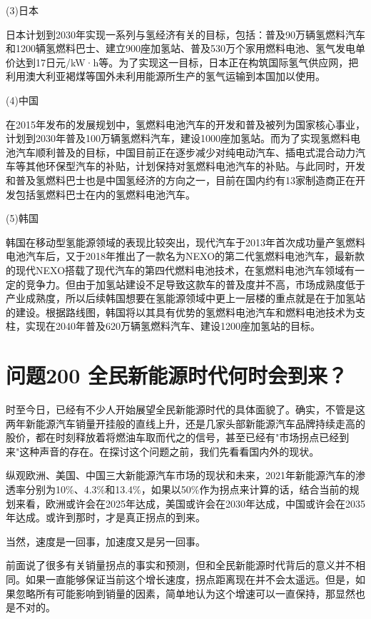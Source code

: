 \documentclass[12pt,UTF8]{ctexbook}
\begin{document}
(3)日本

日本计划到2030年实现一系列与氢经济有关的目标，包括：普及90万辆氢燃料汽车和1200辆氢燃料巴士、建立900座加氢站、普及530万个家用燃料电池、氢气发电单价达到17日元/kW·h等。为了实现这一目标，日本正在构筑国际氢气供应网，把利用澳大利亚褐煤等国外未利用能源所生产的氢气运输到本国加以使用。

(4)中国

在2015年发布的发展规划中，氢燃料电池汽车的开发和普及被列为国家核心事业，计划到2030年普及100万辆氢燃料汽车，建设1000座加氢站。而为了实现氢燃料电池汽车顺利普及的目标，中国目前正在逐步减少对纯电动汽车、插电式混合动力汽车等其他环保型汽车的补贴，计划保持对氢燃料电池汽车的补贴。与此同时，开发和普及氢燃料巴士也是中国氢经济的方向之一，目前在国内约有13家制造商正在开发包括氢燃料巴士在内的氢燃料电池汽车。

(5)韩国

韩国在移动型氢能源领域的表现比较突出，现代汽车于2013年首次成功量产氢燃料电池汽车后，又于2018年推出了一款名为NEXO的第二代氢燃料电池汽车，最新款的现代NEXO搭载了现代汽车的第四代燃料电池技术，在氢燃料电池汽车领域有一定的竞争力。但由于加氢站建设不足导致这款车的普及度并不高，市场成熟度低于产业成熟度，所以后续韩国想要在氢能源领域中更上一层楼的重点就是在于加氢站的建设。根据路线图，韩国将以其具有优势的氢燃料电池汽车和燃料电池技术为支柱，实现在2040年普及620万辆氢燃料汽车、建设1200座加氢站的目标。

\section{问题200 全民新能源时代何时会到来？}

时至今日，已经有不少人开始展望全民新能源时代的具体面貌了。确实，不管是这两年新能源汽车销量开挂般的直线上升，还是几家头部新能源汽车品牌持续走高的股价，都在时刻释放着将燃油车取而代之的信号，甚至已经有"市场拐点已经到来"这种声音的存在。在探讨这个问题之前，我们先看看国内外的现状。

纵观欧洲、美国、中国三大新能源汽车市场的现状和未来，2021年新能源汽车的渗透率分别为10\%、4.3\%和13.4\%，如果以50\%作为拐点来计算的话，结合当前的规划来看，欧洲或许会在2025年达成，美国或许会在2030年达成，中国或许会在2035年达成。或许到那时，才是真正拐点的到来。

当然，速度是一回事，加速度又是另一回事。

前面说了很多有关销量拐点的事实和预测，但和全民新能源时代背后的意义并不相同。如果一直能够保证当前这个增长速度，拐点距离现在并不会太遥远。但是，如果忽略所有可能影响到销量的因素，简单地认为这个增速可以一直保持，那显然也是不对的。
\end{document}
